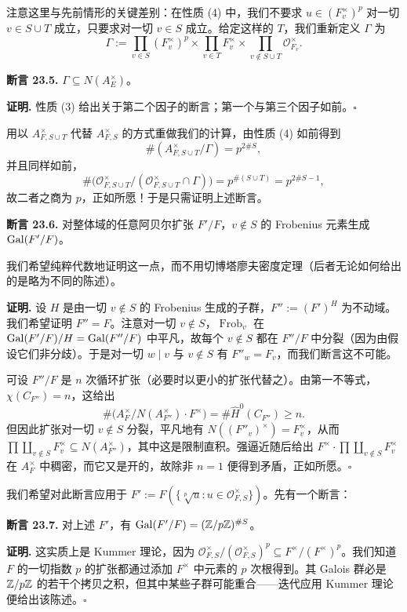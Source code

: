 注意这里与先前情形的关键差别：在性质 (4) 中，我们不要求 $u\in(F_v^\times)^p$ 对一切 $v\in S\cup T$ 成立，只要求对一切 $v\in S$ 成立。给定这样的 $T$，我们重新定义 $\Gamma$ 为
\[
\Gamma:=\prod_{v\in S}(F_v^\times)^p\times\prod_{v\in T}F_v^\times\times\prod_{v\notin S\cup T}\mathcal{O}_{F_v}^\times.
\]

\textbf{断言 23.5.} $\Gamma\subseteq N(A_E^\times)$。

\textbf{证明.} 性质 (3) 给出关于第二个因子的断言；第一个与第三个因子如前。\hfill$\square$

用以 $A_{F,S\cup T}^\times$ 代替 $A_{F,S}^\times$ 的方式重做我们的计算，由性质 (4) 如前得到
\[
\#(A_{F,S\cup T}^\times/\Gamma)=p^{2\#S},
\]
并且同样如前，
\[
\#\bigl(\mathcal{O}_{F,S\cup T}^\times/(\mathcal{O}_{F,S\cup T}^\times\cap\Gamma)\bigr)=p^{\#(S\cup T)}=p^{2\#S-1},
\]
故二者之商为 $p$，正如所愿！于是只需证明上述断言。

\textbf{断言 23.6.} 对整体域的任意阿贝尔扩张 $F'/F$，$v\notin S$ 的 Frobenius 元素生成 $\operatorname{Gal}(F'/F)$。

我们希望纯粹代数地证明这一点，而不用切博塔廖夫密度定理（后者无论如何给出的是略为不同的陈述）。

\textbf{证明.} 设 $H$ 是由一切 $v\notin S$ 的 Frobenius 生成的子群，$F'':=(F')^H$ 为不动域。我们希望证明 $F''=F$。注意对一切 $v\notin S$，$\operatorname{Frob}_v$ 在 $\operatorname{Gal}(F'/F)/H=\operatorname{Gal}(F''/F)$ 中平凡，故每个 $v\notin S$ 都在 $F''/F$ 中分裂（因为由假设它们非分歧）。于是对一切 $w\mid v$ 与 $v\notin S$ 有 $F''_w=F_v$，而我们断言这不可能。

可设 $F''/F$ 是 $n$ 次循环扩张（必要时以更小的扩张代替之）。由第一不等式，$\chi(C_{F''})=n$，这给出
\[
\#\bigl(A_F^\times/N(A_{F''}^\times)\cdot F^\times\bigr)=\#\widehat H^0(C_{F''})\ge n.
\]
但因此扩张对一切 $v\notin S$ 分裂，平凡地有 $N((F''_v)^\times)=F_v^\times$，从而 $\prod\coprod_{v\notin S}F_v^\times\subseteq N(A_{F''}^\times)$，其中这是限制直积。强逼近随后给出 $F^\times\cdot\prod\coprod_{v\notin S}F_v^\times$ 在 $A_F^\times$ 中稠密，而它又是开的，故除非 $n=1$ 便得到矛盾，正如所愿。\hfill$\square$

我们希望对此断言应用于 $F':=F(\{\sqrt[p]{u}:u\in\mathcal{O}_{F,S}^\times\})$。先有一个断言：

\textbf{断言 23.7.} 对上述 $F'$，有 $\operatorname{Gal}(F'/F)=(\mathbb{Z}/p\mathbb{Z})^{\#S}$。

\textbf{证明.} 这实质上是 Kummer 理论，因为 $\mathcal{O}_{F,S}^\times/(\mathcal{O}_{F,S}^\times)^p\subseteq F^\times/(F^\times)^p$。我们知道 $F$ 的一切指数 $p$ 的扩张都通过添加 $F^\times$ 中元素的 $p$ 次根得到。其 Galois 群必是 $\mathbb{Z}/p\mathbb{Z}$ 的若干个拷贝之积，但其中某些子群可能重合——迭代应用 Kummer 理论便给出该陈述。\hfill$\square$

